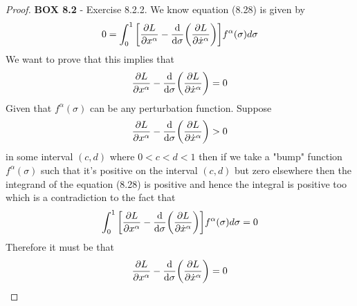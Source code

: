 \documentclass[11pt]{article}
\theoremstyle{definition}
\begin{document}
\begin{proof}{\textbf{BOX 8.2} - Exercise 8.2.2.}
    We know equation (8.28) is given by
    \begin{align*}
        0 = \int_{0}^1 \bigg[
            \partialderivative{L}{x^\alpha}
            - \derivative{}{\sigma}\bigg(
                \partialderivative{L}{\dot{x}^\alpha}
            \bigg)
        \bigg]f^\alpha(\sigma) d\sigma
    \end{align*}
    We want to prove that this implies that
    \begin{align*}
        \partialderivative{L}{x^\alpha}
        - \derivative{}{\sigma}\bigg(
            \partialderivative{L}{\dot{x}^\alpha}
        \bigg) = 0
    \end{align*}
    Given that $f^\alpha(\sigma)$ can be any perturbation function.
    Suppose
    \begin{align*}
        \partialderivative{L}{x^\alpha}
        - \derivative{}{\sigma}\bigg(
            \partialderivative{L}{\dot{x}^\alpha}
        \bigg) > 0
    \end{align*}
    in some interval $(c,d)$ where $0 < c < d < 1$ then if we take a "bump"
    function $f^\alpha(\sigma)$ such that it's positive on the interval $(c,d)$
    but zero elsewhere then the integrand of the equation (8.28) is positive
    and hence the integral is positive too which is a contradiction to 
    the fact that
    \begin{align*}
        \int_{0}^1 \bigg[
            \partialderivative{L}{x^\alpha}
            - \derivative{}{\sigma}\bigg(
                \partialderivative{L}{\dot{x}^\alpha}
            \bigg)
        \bigg]f^\alpha(\sigma) d\sigma = 0
    \end{align*}
    Therefore it must be that 
    \begin{align*}
        \partialderivative{L}{x^\alpha}
        - \derivative{}{\sigma}\bigg(
            \partialderivative{L}{\dot{x}^\alpha}
        \bigg) = 0
    \end{align*}
\end{proof}
\end{document}
